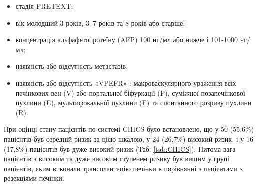 \begin{itemize}
    \item стадія PRETEXT; 
    \item вік молодший 3 років, 3–7 років та 8 років або старше;
    \item концентрація альфафетопротеїну (AFP) 100 нг/мл або нижче і 101-1000 нг/мл;
    \item наявність або відсутність метастазів;
    \item наявність або відсутність «VPEFR» : макроваскулярного ураження всіх печінкових вен (V) або портальної біфуркації (P), суміжної позапечінкової пухлини (E), мультифокальної пухлини (F) та спонтанного розриву пухлини (R).
\end{itemize}

При оцінці стану пацієнтів по системі CHICS було встановлено, що у 50 (55,6\%) пацієнтів був середній ризик за цією шкалою, у 24 (26,7\%) високий ризик, і у 16 (17,8\%) пацієнтів був дуже високий ризик  (Таб. \ref{tab:CHICS}). Питома вага пацієнтів з високим та дуже високим ступенем ризику був вищим у групі пацієнтів, яким виконали трансплантацію печінки в порівнянні з пацієнтами з резекціями печінки.




